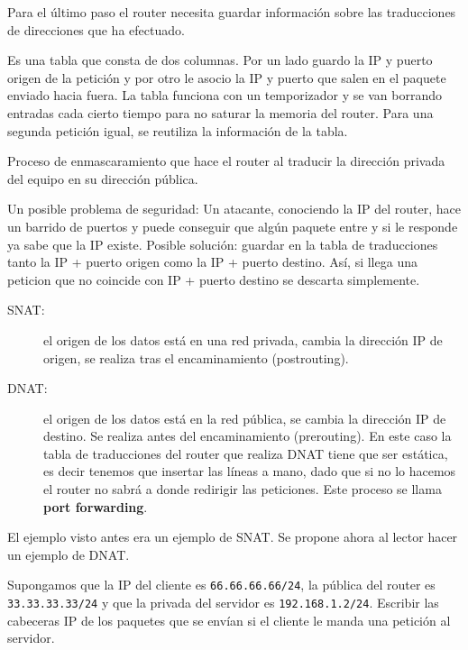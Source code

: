 Para el último paso el router necesita guardar información sobre las traducciones de direcciones que ha efectuado. 
\begin{definicion}
    Es una tabla que consta de dos columnas. Por un lado guardo la IP y puerto origen de la petición y por otro le asocio la IP y puerto que salen en el paquete enviado hacia fuera. 
    La tabla funciona con un temporizador y se van borrando entradas cada cierto tiempo para no saturar la memoria del router. 
    Para una segunda petición igual, se reutiliza la información de la tabla. 
\end{definicion}    

\begin{definicion}[Masquerading]
    Proceso de enmascaramiento que hace el router al traducir la dirección privada del equipo en su dirección pública. 
\end{definicion}

\begin{observacion}
    Un posible problema de seguridad: Un atacante, conociendo la IP del router, hace un barrido de puertos y puede conseguir que algún paquete entre y si le responde ya sabe que la IP existe. 
    Posible solución: guardar en la tabla de traducciones tanto la IP + puerto origen como la IP + puerto destino. Así, si llega una peticion que no coincide con IP + puerto destino se descarta simplemente. 
\end{observacion}

\begin{description}
    \item [\acrshort{SNAT}:] el origen de los datos está en una red privada, cambia la dirección IP de origen, se realiza tras el encaminamiento (postrouting).
    \item [\acrshort{DNAT}:] el origen de los datos está en la red pública, se cambia la dirección IP de destino. Se realiza antes del encaminamiento (prerouting). En este caso la tabla de traducciones del router que realiza \acrshort{DNAT} tiene que ser estática, es decir tenemos que insertar las líneas a mano, dado que si no lo hacemos el router no sabrá a donde redirigir las peticiones. Este proceso se llama \textbf{port forwarding}.
\end{description}

El ejemplo visto antes era un ejemplo de \acrshort{SNAT}. Se propone ahora al lector hacer un ejemplo de \acrshort{DNAT}.

\begin{ejercicio}
    Supongamos que la IP del cliente es \verb|66.66.66.66/24|, la pública del router es \verb|33.33.33.33/24| y que la privada del servidor es \verb|192.168.1.2/24|. Escribir las cabeceras IP de los paquetes que se envían si el cliente le manda una petición al servidor. 
\end{ejercicio}

